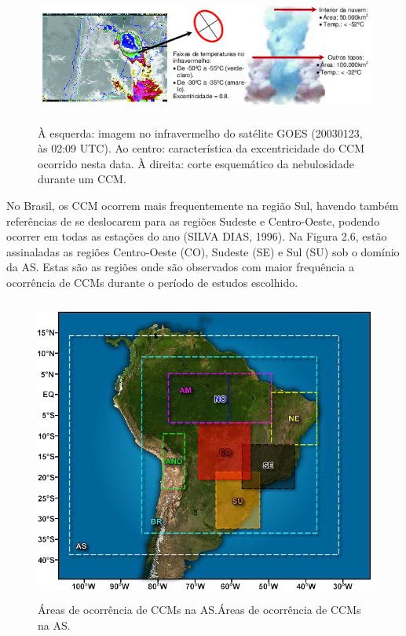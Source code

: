 \begin{figure}
\centering
\includegraphics[height=4.5cm]{./figs/fig08.png}
\caption{À esquerda: imagem no infravermelho do satélite GOES (20030123, às 02:09 UTC). Ao centro: característica da excentricidade do CCM ocorrido nesta data. À direita: corte esquemático da nebulosidade durante um CCM.}
\label{fig08}
\end{figure}

No Brasil, os CCM ocorrem mais frequentemente na região Sul, havendo também referências de se deslocarem para as regiões Sudeste e Centro-Oeste, podendo ocorrer em todas as estações do ano (SILVA DIAS, 1996). Na Figura 2.6, estão assinaladas as regiões Centro-Oeste (CO), Sudeste (SE) e Sul (SU) sob o domínio da AS. Estas são as regiões onde são observados com maior frequência a ocorrência de CCMs durante o período de estudos escolhido.

\begin{figure}
\centering
\includegraphics[height=10cm]{./figs/fig09.png}
\caption{Áreas de ocorrência de CCMs na AS.Áreas de ocorrência de CCMs na AS.}
\label{fig09}
\end{figure}

